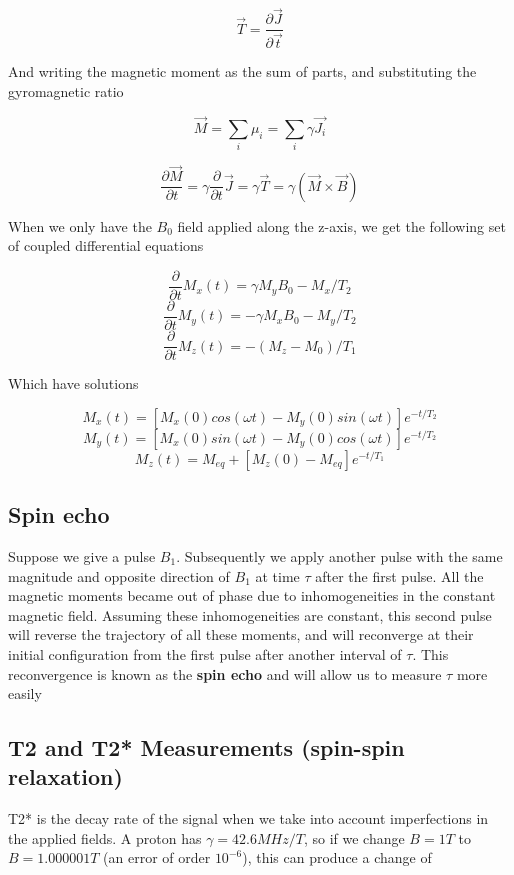 \documentclass[12pt]{article}
\begin{document}
\[ \vec{T} = \frac{\partial{\vec{J}}}{\partial{\vec{t}}}\]

And writing the magnetic moment as the sum of parts, and substituting the gyromagnetic ratio

\[\vec{M} = \sum_i\mu_i = \sum_i\gamma \vec{J_i}\]

\[ \frac{\partial \vec{M}}{\partial t} = \gamma \frac{\partial}{\partial t}\vec{J} = \gamma \vec{T} = \gamma(\vec{M} \times \vec{B})\]

When we only have the $B_0$ field applied along the z-axis, we get the following set of coupled differential equations

\[ \frac{\partial}{\partial t} M_x(t) = \gamma M_y B_0 - M_x/T_2\]
\[ \frac{\partial}{\partial t} M_y(t) = -\gamma M_x B_0 - M_y/T_2\]
\[ \frac{\partial}{\partial t} M_z(t) = -(M_z - M_0)/T_1\]

Which have solutions

\[M_x(t) = [M_x(0)cos(\omega t) - M_y(0)sin(\omega t)]e^{-t/T_2}\]
\[M_y(t) = [M_x(0)sin(\omega t) - M_y(0)cos(\omega t)]e^{-t/T_2}\]
\[M_z(t) = M_{eq} + [M_z(0) - M_{eq}]e^{-t/T_1}\]




\subsection{Spin echo}

Suppose we give a pulse $B_1$. Subsequently we apply another pulse with the same magnitude and opposite direction of $B_1$ at time $\tau$ after the first pulse. All the magnetic moments became out of phase due to inhomogeneities in the constant magnetic field. Assuming these inhomogeneities are constant, this second pulse will reverse the trajectory of all these moments, and will reconverge at their initial configuration from the first pulse after another interval of $\tau$. This reconvergence is known as the \textbf{spin echo} and will allow us to measure $\tau$ more easily

\subsection{T2 and T2* Measurements (spin-spin relaxation)}

T2* is the decay rate of the signal when we take into account imperfections in the applied fields. A proton has $\gamma = 42.6 MHz/T$, so if we change $B= 1T$ to $B = 1.000001T$ (an error of order $10^{-6}$), this can produce a change of
\end{document}
